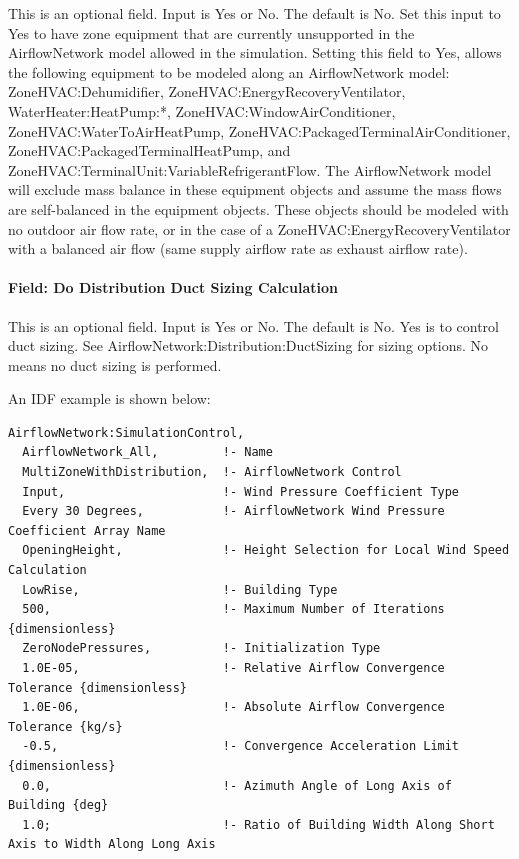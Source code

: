 This is an optional field. Input is Yes or No. The default is No. Set this input to Yes to have zone equipment that are currently unsupported in the AirflowNetwork model allowed in the simulation. Setting this field to Yes, allows the following equipment to be modeled along an AirflowNetwork model: ZoneHVAC:Dehumidifier, ZoneHVAC:EnergyRecoveryVentilator, WaterHeater:HeatPump:*, ZoneHVAC:WindowAirConditioner, ZoneHVAC:WaterToAirHeatPump, ZoneHVAC:PackagedTerminalAirConditioner, ZoneHVAC:PackagedTerminalHeatPump, and ZoneHVAC:TerminalUnit:VariableRefrigerantFlow. The AirflowNetwork model will exclude mass balance in these equipment objects and assume the mass flows are self-balanced in the equipment objects. These objects should be modeled with no outdoor air flow rate, or in the case of a ZoneHVAC:EnergyRecoveryVentilator with a balanced air flow (same supply airflow rate as exhaust airflow rate).

\paragraph{Field: Do Distribution Duct Sizing Calculation}\label{do-distribution-duct-sizing-calculation}

This is an optional field. Input is Yes or No. The default is No. Yes is to control duct sizing. See AirflowNetwork:Distribution:DuctSizing for sizing options. No means no duct sizing is performed.


An IDF example is shown below:

\begin{lstlisting}
AirflowNetwork:SimulationControl,
  AirflowNetwork_All,         !- Name
  MultiZoneWithDistribution,  !- AirflowNetwork Control
  Input,                      !- Wind Pressure Coefficient Type
  Every 30 Degrees,           !- AirflowNetwork Wind Pressure Coefficient Array Name
  OpeningHeight,              !- Height Selection for Local Wind Speed Calculation
  LowRise,                    !- Building Type
  500,                        !- Maximum Number of Iterations {dimensionless}
  ZeroNodePressures,          !- Initialization Type
  1.0E-05,                    !- Relative Airflow Convergence Tolerance {dimensionless}
  1.0E-06,                    !- Absolute Airflow Convergence Tolerance {kg/s}
  -0.5,                       !- Convergence Acceleration Limit {dimensionless}
  0.0,                        !- Azimuth Angle of Long Axis of Building {deg}
  1.0;                        !- Ratio of Building Width Along Short Axis to Width Along Long Axis
\end{lstlisting}

